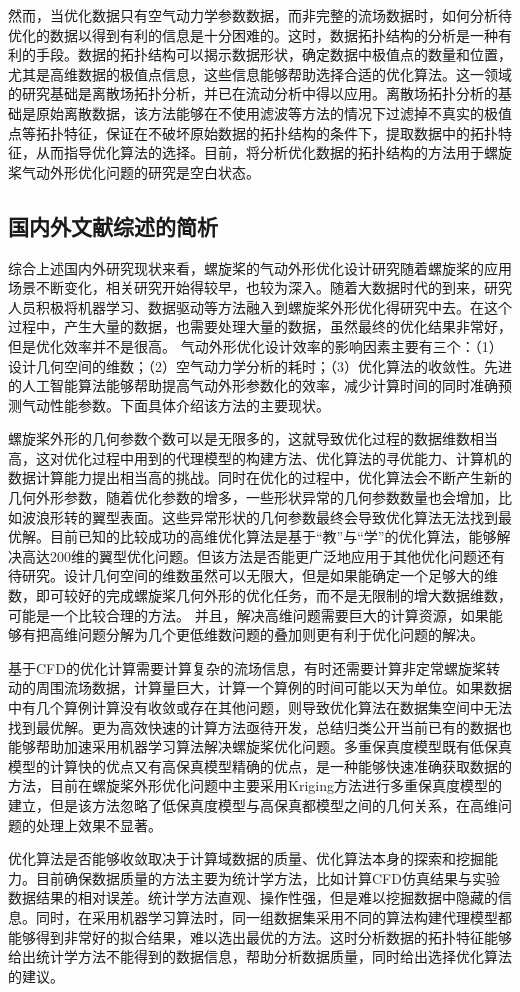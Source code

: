 然而，当优化数据只有空气动力学参数数据，而非完整的流场数据时，如何分析待优化的数据以得到有利的信息是十分困难的。这时，数据拓扑结构的分析是一种有利的手段。数据的拓扑结构可以揭示数据形状，确定数据中极值点的数量和位置，尤其是高维数据的极值点信息，这些信息能够帮助选择合适的优化算法。这一领域的研究基础是离散场拓扑分析\cite{Edelsbrunner2002}，并已在流动分析中得以应用\cite{Kasten2016am}。离散场拓扑分析的基础是原始离散数据，该方法能够在不使用滤波等方法的情况下过滤掉不真实的极值点等拓扑特征，保证在不破坏原始数据的拓扑结构的条件下，提取数据中的拓扑特征，从而指导优化算法的选择。目前，将分析优化数据的拓扑结构的方法用于螺旋桨气动外形优化问题的研究是空白状态。

\subsection{国内外文献综述的简析}\label{Sec: status analysis}
\vspace{0.8em}

综合上述国内外研究现状来看，螺旋桨的气动外形优化设计研究随着螺旋桨的应用场景不断变化，相关研究开始得较早，也较为深入。随着大数据时代的到来，研究人员积极将机器学习、数据驱动等方法融入到螺旋桨外形优化得研究中去。在这个过程中，产生大量的数据，也需要处理大量的数据，虽然最终的优化结果非常好，但是优化效率并不是很高。
气动外形优化设计效率的影响因素主要有三个：（1）设计几何空间的维数；（2）空气动力学分析的耗时；（3）优化算法的收敛性。先进的人工智能算法能够帮助提高气动外形参数化的效率，减少计算时间的同时准确预测气动性能参数。下面具体介绍该方法的主要现状。

螺旋桨外形的几何参数个数可以是无限多的，这就导致优化过程的数据维数相当高，这对优化过程中用到的代理模型的构建方法、优化算法的寻优能力、计算机的数据计算能力提出相当高的挑战。同时在优化的过程中，优化算法会不断产生新的几何外形参数，随着优化参数的增多，一些形状异常的几何参数数量也会增加，比如波浪形转的翼型表面。这些异常形状的几何参数最终会导致优化算法无法找到最优解。目前已知的比较成功的高维优化算法是基于“教”与“学”的优化算法\cite{Wu2022}，能够解决高达200维的翼型优化问题。但该方法是否能更广泛地应用于其他优化问题还有待研究。设计几何空间的维数虽然可以无限大，但是如果能确定一个足够大的维数，即可较好的完成螺旋桨几何外形的优化任务，而不是无限制的增大数据维数，可能是一个比较合理的方法。
并且，解决高维问题需要巨大的计算资源，如果能够有把高维问题分解为几个更低维数问题的叠加则更有利于优化问题的解决。

基于CFD的优化计算需要计算复杂的流场信息，有时还需要计算非定常螺旋桨转动的周围流场数据，计算量巨大，计算一个算例的时间可能以天为单位。如果数据中有几个算例计算没有收敛或存在其他问题，则导致优化算法在数据集空间中无法找到最优解。更为高效快速的计算方法亟待开发，总结归类公开当前已有的数据也能够帮助加速采用机器学习算法解决螺旋桨优化问题。多重保真度模型既有低保真模型的计算快的优点又有高保真模型精确的优点，是一种能够快速准确获取数据的方法，目前在螺旋桨外形优化问题中主要采用Kriging方法进行多重保真度模型的建立\cite{Zhang2024, ChenzhouXu2024}，但是该方法忽略了低保真度模型与高保真都模型之间的几何关系，在高维问题的处理上效果不显著。

优化算法是否能够收敛取决于计算域数据的质量、优化算法本身的探索和挖掘能力。目前确保数据质量的方法主要为统计学方法，比如计算CFD仿真结果与实验数据结果的相对误差。统计学方法直观、操作性强，但是难以挖掘数据中隐藏的信息。同时，在采用机器学习算法时，同一组数据集采用不同的算法构建代理模型都能够得到非常好的拟合结果，难以选出最优的方法。这时分析数据的拓扑特征能够给出统计学方法不能得到的数据信息，帮助分析数据质量，同时给出选择优化算法的建议。

